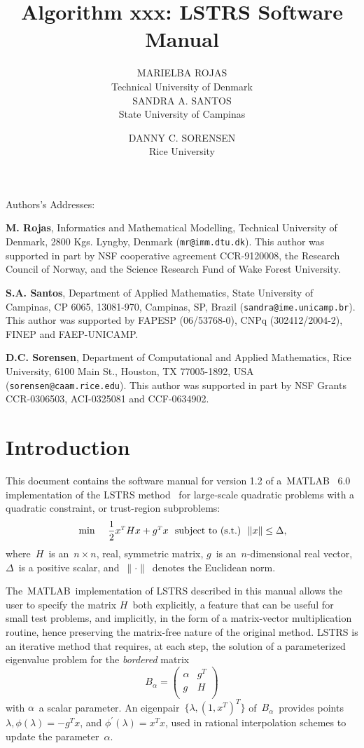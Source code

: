 \documentclass[acmtoms]{acmtrans2m}
\title{Algorithm xxx: LSTRS Software Manual}
\author{MARIELBA ROJAS \\ Technical University of Denmark\\
SANDRA A. SANTOS \\State University of Campinas
\and
DANNY C. SORENSEN \\Rice University
}
\newcommand{\trans}{^{\scriptscriptstyle T}}
\newcommand{\norm}{\|}
\newcommand{\rad}{{\Delta}}
\newcommand{\bord}{B_{\alpha}}
\newcommand{\bormat}{
\left(
\begin{array}{cc}
\alpha & g\trans \\
g & \hessian\\
\end{array}
\right)
}
\newcommand{\onext}{(1,x\trans)\trans}
\newcommand{\philam}{\phi(\lambda)}
\newcommand{\dphilam}{\phi^{\prime}(\lambda)}
\newcommand{\matlab}{MATLAB}
\newcommand{\hessian}{H}
\newcommand{\ntn}{n\times n}
\newcommand{\ds}{\displaystyle}
\begin{document}
\begin{bottomstuff}
Authors's Addresses: 

{\bf M. Rojas}, Informatics and Mathematical Modelling,
Technical University of Denmark, 2800 Kgs. Lyngby,
Denmark ({\tt mr@imm.dtu.dk}). This author was supported in part by
NSF cooperative agreement CCR-9120008, the Research Council of Norway,
and the Science Research Fund of Wake Forest University.

{\bf S.A. Santos}, Department of Applied Mathematics, State
University of Campinas, CP 6065, 13081-970, Campinas, SP, Brazil
({\tt sandra@ime.unicamp.br}). This author was supported by
FAPESP (06/53768-0), CNPq (302412/2004-2), FINEP and FAEP-UNICAMP.

{\bf D.C. Sorensen}, Department of Computational and Applied
Mathematics, Rice University, 6100 Main St., Houston, TX 77005-1892,
USA ({\tt sorensen@caam.rice.edu}).
This author was supported in part by NSF Grants
CCR-0306503, ACI-0325081 and CCF-0634902.
\end{bottomstuff}

\maketitle


\section{Introduction}

This document contains the software manual for version 1.2 of 
a\ \matlab~\cite{matlab} 6.0 implementation
of the LSTRS method~\cite{rss2000} for large-scale
quadratic problems with a quadratic constraint, or trust-region
subproblems:
\begin{eqnarray}
&\min&\ \frac{1}{2} x\trans \hessian x + g\trans x\ {\rm\ subject\ to\ (s.t.)\ }\ \norm x\norm \leq \rad, \label{trs}
\end{eqnarray}
where\ $\hessian$\ is an\ $\ntn$, real, symmetric matrix, $g$\ is
an\ $n$-dimensional real vector,\ $\rad$\ is a positive scalar,
and\ $\norm\cdot\norm$\ denotes the Euclidean norm.

The\ \matlab\ implementation of LSTRS described in this manual allows the
user to specify the matrix
$\hessian$\ both explicitly, a feature that can be useful for small test
problems,
and implicitly, in the form of a matrix-vector multiplication routine, hence
preserving the matrix-free nature of the original method. LSTRS is an iterative
method that requires, at each step, the solution of a parameterized eigenvalue
problem for the {\em bordered} matrix
\[
\bord = \bormat
\]
with $\ds\alpha$\ a scalar parameter. An eigenpair\ $\ds\{\lambda,\onext\}$
of\ $\ds\bord$\ provides points\ $\lambda, \philam = -g\trans x$, and
$\dphilam = x\trans x$, used in rational interpolation schemes
to update the parameter\ $\ds\alpha$.
\end{document}
